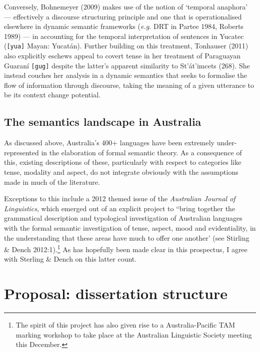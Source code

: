 \documentclass[12pt]{article}
\begin{document}
 

Conversely, Bohnemeyer (2009) makes use of the notion of `temporal anaphora' --- effectively a discourse structuring principle and one that is operationalised elsewhere in dynamic semantic frameworks (\textit{e.g.} DRT in Partee 1984, Roberts 1989) --- in accounting for the temporal interpretation of sentences in Yucatec (\texttt{[yua]} Mayan: Yucatán). Further building on this treatment, Tonhauser (2011) also explicitly eschews appeal to covert tense in her treatment of Paraguayan Guaraní \texttt{[gug]} despite the latter's apparent similarity to St'át'imcets (268). She instead couches her analysis in a dynamic semantics that seeks to formalise the flow of information through discourse, taking the meaning of a given utterance to be its context change potential. 


\subsection{The semantics landscape in Australia} \label{aus}
As discussed above, Australia's 400+ languages have been extremely under-represented in the elaboration of formal semantic theory. As a consequence of this, existing descriptions of these, particularly with respect to categories like tense, modality and aspect, do not integrate obviously with the assumptions made in much of the literature.

Exceptions to this include a 2012 themed issue of the \textit{Australian Journal of Linguistics}, which emerged out of an explicit project to ``bring together the grammatical description and typological investigation of Australian languages with the formal semantic investigation of tense, aspect, mood and evidentiality, in the understanding that these areas have much to offer one another' (see Stirling \& Dench 2012:1).\footnote{The spirit of this project has also given rise to a Australia-Pacific TAM marking workshop to take place at the Australian Linguistic Society meeting this December.} As has hopefully been made clear in this prospectus, I agree with Sterling \& Dench on this latter count.

\section{Proposal: dissertation structure}
\end{document}
